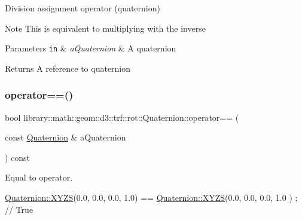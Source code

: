 Division assignment operator (quaternion) 

\begin{DoxyNote}{Note}
This is equivalent to multiplying with the inverse
\end{DoxyNote}

\begin{DoxyParams}[1]{Parameters}
\mbox{\tt in}  & {\em a\+Quaternion} & A quaternion \\
\hline
\end{DoxyParams}
\begin{DoxyReturn}{Returns}
A reference to quaternion 
\end{DoxyReturn}
\mbox{\label{classlibrary_1_1math_1_1geom_1_1d3_1_1trf_1_1rot_1_1_quaternion_a38dba43ef4dbd3aa664cc2534013de2c}} 
\subsubsection{\texorpdfstring{operator==()}{operator==()}}
{\footnotesize\ttfamily bool library\+::math\+::geom\+::d3\+::trf\+::rot\+::\+Quaternion\+::operator== (\begin{DoxyParamCaption}\item[{const \hyperlink{classlibrary_1_1math_1_1geom_1_1d3_1_1trf_1_1rot_1_1_quaternion}{Quaternion} \&}]{a\+Quaternion }\end{DoxyParamCaption}) const}



Equal to operator. 


\begin{DoxyCode}
\hyperlink{classlibrary_1_1math_1_1geom_1_1d3_1_1trf_1_1rot_1_1_quaternion_a006294eb483bcfc352c2dc36cf19ceec}{Quaternion::XYZS}(0.0, 0.0, 0.0, 1.0) == \hyperlink{classlibrary_1_1math_1_1geom_1_1d3_1_1trf_1_1rot_1_1_quaternion_a006294eb483bcfc352c2dc36cf19ceec}{Quaternion::XYZS}(0.0, 0.0, 0.0, 1.0
      ) ; \textcolor{comment}{// True}
\end{DoxyCode}



